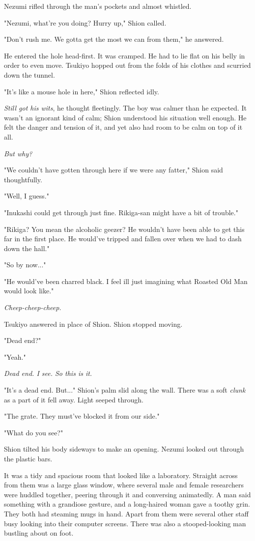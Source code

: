 Nezumi rifled through the man's pockets and almost whistled.

"Nezumi, what're you doing? Hurry up," Shion called.

"Don't rush me. We gotta get the most we can from them," he answered.

He entered the hole head-first. It was cramped. He had to lie flat on
his belly in order to even move. Tsukiyo hopped out from the folds of
his clothes and scurried down the tunnel.

"It's like a mouse hole in here," Shion reflected idly.

\emph{Still got his wits}, he thought fleetingly. The boy was calmer than he
expected. It wasn't an ignorant kind of calm; Shion understood his
situation well enough. He felt the danger and tension of it, and yet
also had room to be calm on top of it all.

\emph{But why?}

"We couldn't have gotten through here if we were any fatter," Shion said
thoughtfully.

"Well, I guess."

"Inukashi could get through just fine. Rikiga-san might have a bit of
trouble."

"Rikiga? You mean the alcoholic geezer? He wouldn't have been able to
get this far in the first place. He would've tripped and fallen over
when we had to dash down the hall."

"So by now..."

"He would've been charred black. I feel ill just imagining what Roasted
Old Man would look like."

\emph{Cheep-cheep-cheep.}

Tsukiyo answered in place of Shion. Shion stopped moving.

"Dead end?"

"Yeah."

\emph{Dead end. I see. So this is it.}

"It's a dead end. But..." Shion's palm slid along the wall. There was a
soft \emph{clunk} as a part of it fell away. Light seeped through.

"The grate. They must've blocked it from our side."

"What do you see?"

Shion tilted his body sideways to make an opening. Nezumi looked out
through the plastic bars.

It was a tidy and spacious room that looked like a laboratory. Straight
across from them was a large glass window, where several male and female
researchers were huddled together, peering through it and conversing
animatedly. A man said something with a grandiose gesture, and a
long-haired woman gave a toothy grin. They both had steaming mugs in
hand. Apart from them were several other staff busy looking into their
computer screens. There was also a stooped-looking man bustling about on
foot.

